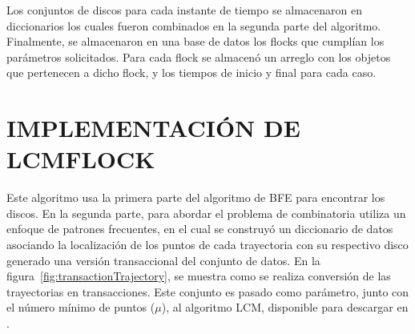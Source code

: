 Los conjuntos de discos para 
cada instante de tiempo se almacenaron en diccionarios los cuales fueron combinados en la segunda 
parte del algoritmo.  Finalmente, se almacenaron en una base de datos los flocks que cumplían los 
parámetros solicitados.  Para cada flock se almacenó un arreglo con los objetos que pertenecen a 
dicho flock, y los tiempos de inicio y final para cada caso.


\section{IMPLEMENTACIÓN DE LCMFLOCK}

Este algoritmo usa la primera parte del algoritmo de BFE para encontrar los discos. En la segunda 
parte, para abordar el problema
de combinatoria utiliza un enfoque de patrones frecuentes, en el cual se construyó un 
diccionario de datos asociando la localización 
de los puntos de cada trayectoria con su respectivo disco generado una versión transaccional del 
conjunto de datos. En la figura~\ref{fig:transactionTrajectory}, se muestra como se realiza conversión de las trayectorias en  
transacciones. Este conjunto
es pasado como parámetro, junto con el  número mínimo de puntos ($\mu$), al algoritmo 
LCM\cite{uno2004lcm}, disponible para descargar en \cite{FIMIHomep}.

